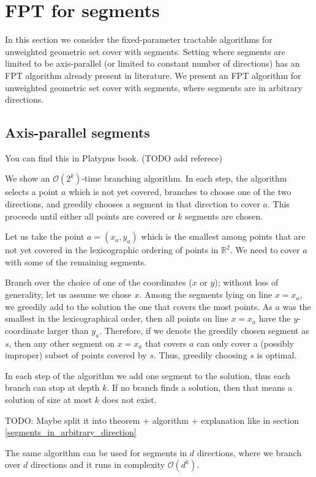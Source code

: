 \section{FPT for segments}
In this section we consider the fixed-parameter tractable
algorithms for unweighted geometric set cover with segments.
Setting where segments are limited to be axis-parallel
(or limited to constant number of directions) has an FPT
algorithm already present in literature.
We present an FPT algorithm for unweighted geometric set cover
with segments, where segments are in arbitrary directions.

\subsection{Axis-parallel segments}
You can find this in Platypus book. (TODO add referece)

We show an $\mathcal{O}(2^k)$-time branching algorithm.
In each step, the algorithm selects a point $a$ which is not yet covered,
branches to choose one of the two directions, and greedily chooses
a segment in that direction to cover $a$.
This proceeds until either all points are covered or $k$ segments are chosen.

Let us take
the point $a=(x_a,y_a)$ which is the smallest 
among points that are not yet covered
in the lexicographic ordering
of points in $\mathbb{R}^2$.
We need to cover $a$ with some of the remaining segments.

Branch over the choice of one of the coordinates ($x$ or $y$);
without loss of generality, let us assume we chose $x$.
Among the segments lying on line $x = x_a$,
we greedily add to the solution the one that covers the most points.
As $a$ was the smallest in the lexicographical order,
then all points on line $x = x_a$ have the $y$-coordinate larger than $y_a$.
Therefore, if we denote the greedily chosen segment as $s$,
then any other segment on $x = x_a$ that covers $a$ can only
cover a (possibly improper) subset of points covered by $s$.
Thus, greedily choosing $s$ is optimal.

In each step of the algorithm we add one segment to the solution,
thus each branch can stop at depth $k$.
If no branch finds a solution, then that means a solution of size at most $k$ does not exist.

TODO: Maybe split it into theorem + algorithm + explanation like in 
section
\ref{segments_in_arbitrary_direction}

\begin{remark}
The same algorithm can be used for segments in $d$ directions,
where we branch over $d$ directions and it runs in complexity $\mathcal{O}(d^k)$.
\end{remark}


